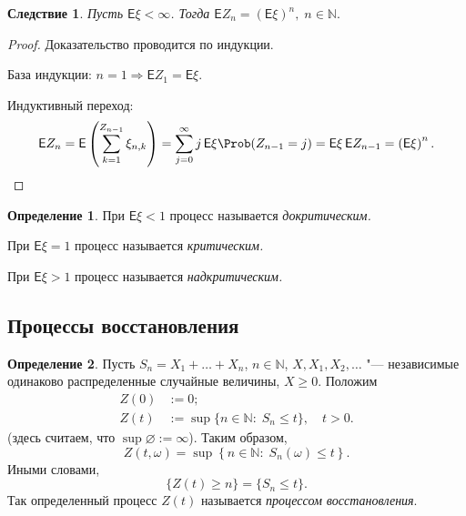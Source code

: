 \documentclass[a4paper]{article}
\newcommand{\Expect}{\mathsf{E}}
\theoremstyle{plain}
\newtheorem*{cor}{Следствие}
\theoremstyle{definition}
\newtheorem{defn}{Определение}[section]
\theoremstyle{remark}
\begin{document}
\begin{cor}
  Пусть $\Expect \xi < \infty$. Тогда $\Expect Z_{n} = (\Expect \xi)^{n},\; n \in \mathbb{N}{.}$
\end{cor}

\begin{proof}
  Доказательство проводится по индукции.

  База индукции: $n=1 \Rightarrow \Expect Z_{1} = \Expect \xi$.

  Индуктивный переход:
  \begin{equation*}
    \Expect Z_{n} = \Expect \left( \sum_{k=1}^{Z_{n-1}} \xi_{n,k} \right) = \sum\limits_{j=0}^{\infty} j \, \Expect \xi \Prob (Z_{n-1} = j) = \Expect \xi \, \Expect Z_{n-1} = \left(\Expect \xi \right)^{n}.
  \end{equation*}
\end{proof}

\begin{defn}\mbox{}

  При $\Expect \xi < 1$ процесс называется \emph{докритическим.}

  При $\Expect \xi = 1$ процесс называется \emph{критическим.}

  При $\Expect \xi > 1$ процесс называется \emph{надкритическим.}
\end{defn}

\subsection{Процессы восстановления}

\begin{defn}
  Пусть $S_{n} = X_{1} + \ldots + X_{n}$, $n \in \mathbb{N}$, $X, X_{1}, X_{2}, \ldots$ "--- независимые одинаково распределенные случайные величины, $X \geqslant 0$. Положим
  \begin{align*}
    Z(0) &:= 0;\\
    Z(t) &:= \sup \lbrace n \in \mathbb{N}:\; S_{n} \leqslant t \rbrace{,}\quad t > 0.
  \end{align*}
  (здесь считаем, что $\sup \varnothing := \infty$). Таким образом,
  \begin{equation*}
    Z(t, \omega) = \sup \left\lbrace n \in \mathbb{N}: \; S_{n}(\omega) \leqslant t \right\rbrace{.}
  \end{equation*}
  Иными словами,
  \begin{equation*}
    \lbrace Z(t) \geqslant n \rbrace = \lbrace S_{n} \leqslant t \rbrace{.}
  \end{equation*}
  Так определенный процесс $Z(t)$ называется \emph{процессом восстановления}.
\end{defn}
\end{document}
